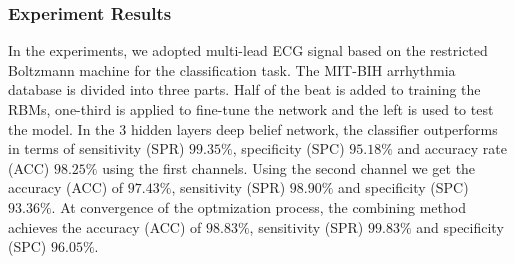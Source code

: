 \documentclass[graybox]{svmult}
\begin{document}
\subsubsection{Experiment Results}

In the experiments, we adopted multi-lead ECG signal based on the restricted Boltzmann machine for the classification task. The MIT-BIH arrhythmia database is divided into three parts. Half of the beat is added to training the RBMs, one-third is applied to fine-tune the network and the left is used to test the model. In the 3 hidden layers deep belief network, the classifier outperforms in terms of sensitivity (SPR) $99.35\%$, specificity (SPC) $95.18\%$ and accuracy rate (ACC) $98.25\%$ using the first channels. Using the second channel we get the accuracy (ACC) of $97.43\%$, sensitivity (SPR) $98.90\%$ and specificity (SPC) $93.36\%$. At convergence of the optmization process, the combining method achieves the accuracy (ACC) of $98.83\%$, sensitivity (SPR) $99.83\%$ and specificity (SPC) $96.05\%$.
\end{document}
